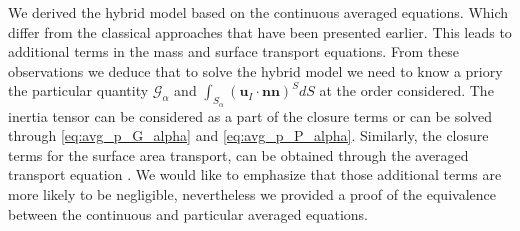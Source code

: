 We derived the hybrid model based on the continuous averaged equations. 
Which differ from the classical approaches that have been presented earlier. 
This leads to additional terms in the mass and surface transport equations. 
From these observations we deduce that to solve the hybrid model we need to know a priory the particular quantity $\mathcal{G}_\alpha$ and $\int_{S_\alpha} (\textbf{u}_I \cdot \textbf{nn})^S dS$ at the order considered. 
The inertia tensor can be considered as a part of the closure terms or can be solved through \ref{eq:avg_p_G_alpha} and \ref{eq:avg_p_P_alpha}. 
Similarly, the closure terms for the surface area transport, can be obtained through the averaged transport equation \citep{lhuillier2000bilan}.  
We would like to emphasize that those additional terms are more likely to be negligible, nevertheless we provided a proof of the equivalence between the continuous and particular averaged equations.

